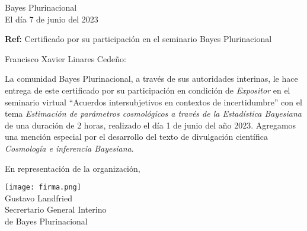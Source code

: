 \documentclass[a4paper,11pt]{letter}
\begin{document}
\begin{letter}{\phantom{.}}


\begin{flushright}
Bayes Plurinacional \\
El día 7 de junio del 2023
\end{flushright}

\vspace{1cm}
\noindent

\hfill \textbf{Ref:} Certificado por su participación en el seminario Bayes Plurinacional\\

\vspace{1cm}

\hspace{0.3cm} Francisco Xavier Linares Cedeño:


\hspace{1cm} La comunidad Bayes Plurinacional, a través de sus autoridades interinas, le hace entrega de este certificado por su participación en condición de \emph{Expositor} en el seminario virtual ``Acuerdos intersubjetivos en contextos de incertidumbre'' con el tema \emph{Estimación de parámetros cosmológicos a través de la Estadística Bayesiana} de una duración de 2 horas, realizado el día 1 de junio del año 2023. Agregamos una mención especial por el desarrollo del texto de divulgación científica \emph{Cosmología e inferencia Bayesiana}.

\vspace{0.3cm}

\hspace{1cm} En representación de la organización,


\begin{flushleft}
\hfill \texttt{[image: firma.png]}\hspace{2cm}\phantom{.} \\[0cm]
\hfill Gustavo Landfried \hspace{2.5cm}\phantom{.}\\ \small
\hfill Secrertario General Interino \hspace{2.5cm}\phantom{.}\\
\hfill de Bayes Plurinacional \hspace{2.5cm}\phantom{.}\\
\end{flushleft}


%
%
%


 \end{letter}
\end{document}
